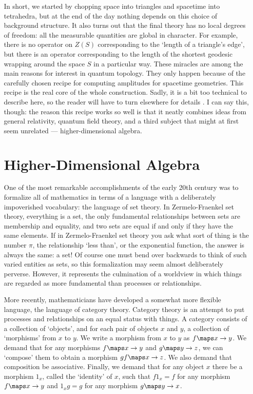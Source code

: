 In short, we started by chopping space into triangles and spacetime into
tetrahedra, but at the end of the day nothing depends on this choice of
background structure.  It also turns out that the final theory has no
local degrees of freedom: all the measurable quantities are global in
character.   For example, there is no operator on $Z(S)$ corresponding
to the `length of a triangle's edge', but there is an operator
corresponding to the length of the shortest geodesic wrapping around the
space $S$ in a particular way.  These miracles are among the main
reasons for interest in quantum topology.  They only happen because of
the carefully chosen recipe for computing amplitudes for spacetime
geometries.   This recipe is the real core of the whole construction. 
Sadly, it is a bit too technical to describe here, so the reader will
have to turn elsewhere for details \cite{Kauffman,Turaev}.  I can say
this, though: the reason this recipe works so well is that it neatly
combines ideas from general relativity, quantum field theory, and a
third subject that might at first seem unrelated --- higher-dimensional
algebra.

\section{Higher-Dimensional Algebra} \label{HDA}

One of the most remarkable accomplishments of the early 20th century 
was to formalize all of mathematics in terms of a language with a
deliberately impoverished vocabulary: the language of set theory.  In
Zermelo-Fraenkel set theory, everything is a set, the only fundamental
relationships between sets are membership and equality, and two sets are
equal if and only if they have the same elements.  If in Zermelo-Fraenkel
set theory you ask what sort of thing is the number $\pi$, the
relationship `less than', or the exponential function, the answer is
always the same: a set!  Of course one must bend over backwards to think
of such varied entities as sets, so this formalization may seem almost
deliberately perverse.   However, it represents the culmination of a
worldview in which things are regarded as more fundamental than processes 
or relationships.

More recently, mathematicians have developed a somewhat more flexible
language, the language of category theory.  Category theory is an attempt
to put processes and relationships on an equal status with things.  A
category consists of a collection of `objects', and for each pair of
objects $x$ and $y$, a collection of `morphisms' from $x$ to $y$.  We
write a morphism from $x$ to $y$ as $f \maps x \to y$.   We demand
that for any morphisms $f \maps x \to y$ and $g \maps y \to z$, we can
`compose' them to obtain a morphism $gf \maps x \to z$.  We also demand
that composition be associative.  Finally, we demand that for any object
$x$ there be a morphism $1_x$, called the `identity' of $x$, such that 
$f1_x = f$ for any morphism $f \maps x \to y$ and $1_x g = g$ for any 
morphism $g \maps y \to x$. 

